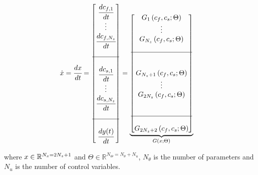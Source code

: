 \documentclass[a4paper,fleqn]{cas-dc}
\begin{document}
			{\footnotesize
				\begin{align*} \label{discretization}
					\dot{x} &= \cfrac{d x}{d t} = 
					\begin{bmatrix}
						\cfrac{d c_{f,1}}{d t} 	  \\
						\vdots		\\	
						\cfrac{d c_{f,N_z}}{d t} \\
						\\ \hline  	\\
						\cfrac{d c_{s,1}}{d t} 	  \\
						\vdots		\\
						\cfrac{d c_{s,N_z}}{d t} \\
						\\ \hline \\
						\cfrac{d {\color{black}y}(t)}{d t}
					\end{bmatrix}
					=
					\underbrace{\begin{bmatrix}
							G_1 \left( c_f,c_s; \Theta \right)\\ 
							\vdots\\ 
							G_{N_z} \left( c_f,c_s; \Theta \right)\\ 
							\\ \hline \\ \\
							G_{N_z+1} \left( c_f,c_s; \Theta \right)\\ 
							\vdots\\
							G_{2N_z} \left( c_f,c_s; \Theta \right)\\ 
							\\ \\ \hline \\
							G_{2N_z+2} \left( c_f,c_s; \Theta \right) 
					\end{bmatrix}}_{G \left( x; \Theta \right)} 
			\end{align*} }
			
			where ${\color{black}x} \in \mathbb{R}^{N_x = 2N_z+1} $ and $\Theta \in \mathbb{R}^{N_\Theta =  N_{\theta} + N_u } $, $N_{\theta}$ is the number of parameters and $N_{u}$ is the number of control variables.
			
\end{document}

